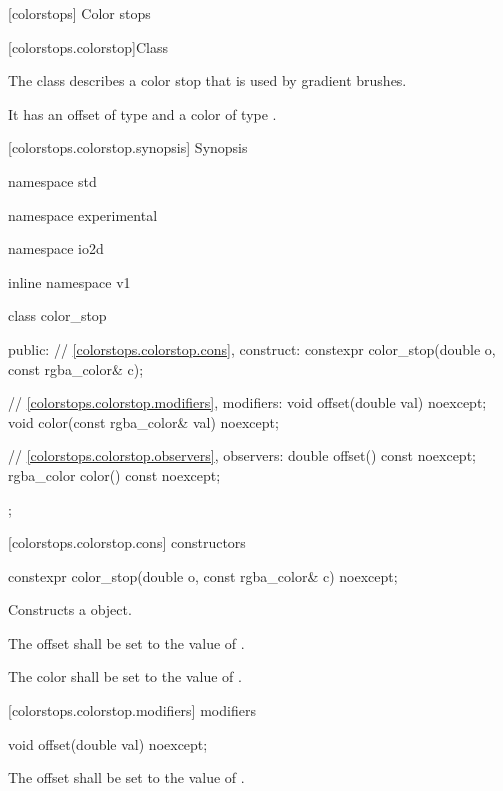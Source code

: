  [colorstops] {Color stops}

 [colorstops.colorstop]{Class }

\pnum
{}
The class  describes a color stop that is used by gradient brushes.

\pnum
It has an offset of type  and a color of type .

 [colorstops.colorstop.synopsis] { Synopsis}

\begin{codeblock}
namespace std { namespace experimental { namespace io2d { inline namespace v1 {
  class color_stop {
  public:
  	// \ref{colorstops.colorstop.cons}, construct:
    constexpr color_stop(double o, const rgba_color& c);
    
    // \ref{colorstops.colorstop.modifiers}, modifiers:
    void offset(double val) noexcept;
	void color(const rgba_color& val) noexcept;
	
    // \ref{colorstops.colorstop.observers}, observers:
	double offset() const noexcept;
	rgba_color color() const noexcept;
  };
} } } }
\end{codeblock}

 [colorstops.colorstop.cons]{ constructors}

\begin{itemdecl}
	constexpr color_stop(double o, const rgba_color& c) noexcept;
\end{itemdecl}
\begin{itemdescr}
	\pnum
	\effects
	Constructs a  object.
	
	\pnum
	The offset shall be set to the value of .
	
	\pnum
	The color shall be set to the value of .
\end{itemdescr}

 [colorstops.colorstop.modifiers]{ modifiers}

\begin{itemdecl}
	void offset(double val) noexcept;
\end{itemdecl}
\begin{itemdescr}
	\pnum
	\effects
	The offset shall be set to the value of .
\end{itemdescr}

